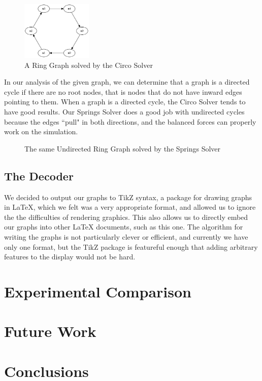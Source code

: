 \documentclass{article}
\begin{document}
\begin{figure}[h!]
\caption{A Ring Graph solved by the Circo Solver}
\centering
\includegraphics[width=0.3\textwidth]{circo.jpg}
\end{figure}

In our analysis of the given graph, we can determine that a graph is a directed cycle if there are no root nodes, that is nodes that do not have inward edges pointing to them. When a graph is a directed cycle, the Circo Solver tends to have good results. Our Springs Solver does a good job with undirected cycles because the edges ``pull" in both directions, and the balanced forces can properly work on the simulation. 

\begin{figure}
\caption{The same Undirected Ring Graph solved by the Springs Solver}
\end{figure}


\subsection{The Decoder}
We decided to output our graphs to TikZ syntax, a package for drawing graphs in LaTeX, which we felt was a very appropriate format, and allowed us to ignore the 
the difficulties of rendering graphics. This also allows us to directly embed our graphs into other LaTeX documents, such as this one. The algorithm for 
writing the graphs is not particularly clever or efficient, and currently we have only one format, but the TikZ package is featureful enough that adding arbitrary
features to the display would not be hard.


\section{Experimental Comparison}


\section{Future Work}


\section{Conclusions}



\end{document}
